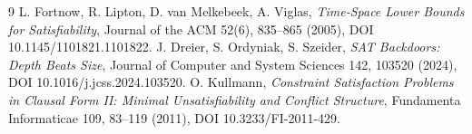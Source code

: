 \documentclass[11pt]{article}
\begin{document}
\begin{thebibliography}{9}
 L. Fortnow, R. Lipton, D. van Melkebeek, A. Viglas,
\emph{Time-Space Lower Bounds for Satisfiability}, Journal of the ACM 52(6), 835--865 (2005), DOI 10.1145/1101821.1101822.
 J. Dreier, S. Ordyniak, S. Szeider,
\emph{SAT Backdoors: Depth Beats Size}, Journal of Computer and System Sciences 142, 103520 (2024), DOI 10.1016/j.jcss.2024.103520.
 O. Kullmann,
\emph{Constraint Satisfaction Problems in Clausal Form II: Minimal Unsatisfiability and Conflict Structure}, Fundamenta Informaticae 109, 83--119 (2011), DOI 10.3233/FI-2011-429.
\end{thebibliography}
\end{document}

